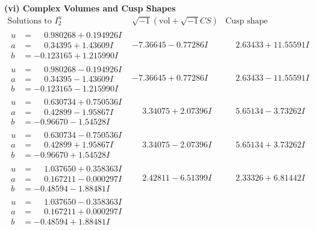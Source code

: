 \documentclass[1p]{elsarticle_modified}
\theoremstyle{definition}
\newcommand{\I}{\sqrt{-1}}
\begin{document}
\newpage\flushleft \textbf{(vi) Complex Volumes and Cusp Shapes}
$$\begin{array}{c|c|c}  
\text{Solutions to }I^u_{2}& \I (\text{vol} + \sqrt{-1}CS) & \text{Cusp shape}\\
 \hline 
\begin{aligned}
u &= \phantom{-}0.980268 + 0.194926 I \\
a &= \phantom{-}0.34395 + 1.43609 I \\
b &= -0.123165 + 1.215990 I\end{aligned}
 & -7.36645 - 0.77286 I & \phantom{-}2.63433 + 11.55591 I \\ \hline\begin{aligned}
u &= \phantom{-}0.980268 - 0.194926 I \\
a &= \phantom{-}0.34395 - 1.43609 I \\
b &= -0.123165 - 1.215990 I\end{aligned}
 & -7.36645 + 0.77286 I & \phantom{-}2.63433 - 11.55591 I \\ \hline\begin{aligned}
u &= \phantom{-}0.630734 + 0.750536 I \\
a &= \phantom{-}0.42899 - 1.95867 I \\
b &= -0.96670 - 1.54528 I\end{aligned}
 & \phantom{-}3.34075 + 2.07396 I & \phantom{-}5.65134 - 3.73262 I \\ \hline\begin{aligned}
u &= \phantom{-}0.630734 - 0.750536 I \\
a &= \phantom{-}0.42899 + 1.95867 I \\
b &= -0.96670 + 1.54528 I\end{aligned}
 & \phantom{-}3.34075 - 2.07396 I & \phantom{-}5.65134 + 3.73262 I \\ \hline\begin{aligned}
u &= \phantom{-}1.037650 + 0.358363 I \\
a &= \phantom{-}0.167211 - 0.000297 I \\
b &= -0.48594 - 1.88481 I\end{aligned}
 & \phantom{-}2.42811 - 6.51399 I & \phantom{-}2.33326 + 6.81442 I \\ \hline\begin{aligned}
u &= \phantom{-}1.037650 - 0.358363 I \\
a &= \phantom{-}0.167211 + 0.000297 I \\
b &= -0.48594 + 1.88481 I\end{aligned}

\end{array}$$
\end{document}
